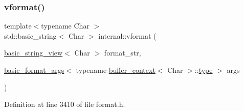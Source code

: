 \subsubsection{\texorpdfstring{vformat()}{vformat()}\hspace{0.1cm}{\footnotesize\ttfamily [2/2]}}
{\footnotesize\ttfamily template$<$typename Char $>$ \\
std\+::basic\+\_\+string$<$ Char $>$ internal\+::vformat (\begin{DoxyParamCaption}\item[{\hyperlink{classbasic__string__view}{basic\+\_\+string\+\_\+view}$<$ Char $>$}]{format\+\_\+str,  }\item[{\hyperlink{classbasic__format__args}{basic\+\_\+format\+\_\+args}$<$ typename \hyperlink{structbuffer__context}{buffer\+\_\+context}$<$ Char $>$\+::\hyperlink{namespaceinternal_a8661864098ac0acff9a6dd7e66f59038}{type} $>$}]{args }\end{DoxyParamCaption})\hspace{0.3cm}{\ttfamily [inline]}}



Definition at line 3410 of file format.\+h.

